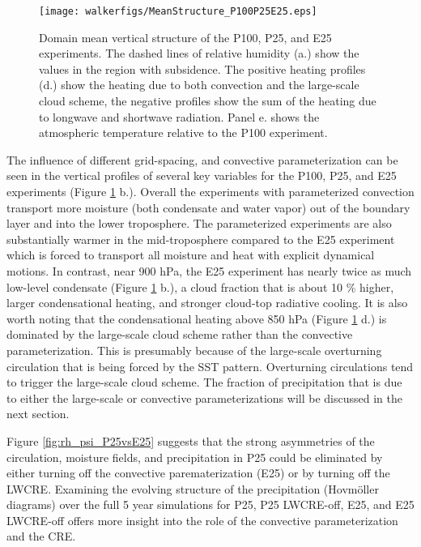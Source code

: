 \documentclass[draft]{agujournal2019}
\begin{document}
\begin{figure}
  \centering
      \texttt{[image: walkerfigs/MeanStructure\_P100P25E25.eps]}
  \caption{Domain mean vertical structure of the P100, P25, and E25 experiments.  The dashed lines of relative humidity (a.) show the values 
  in the region with subsidence.  The positive heating profiles (d.) show the heating due to both convection and the large-scale cloud scheme, the negative
  profiles show the sum of the heating due to longwave and shortwave radiation.  Panel e. shows the atmospheric temperature relative to the P100 experiment.}
  \label{fig:profiles_P100P25E25}
\end{figure}


The influence of different grid-spacing, and convective parameterization can be seen in the vertical profiles of several key variables for 
the P100, P25, and E25 experiments (Figure \ref{fig:profiles_P100P25E25} b.).  
Overall the experiments with parameterized convection transport more moisture (both condensate and water vapor)
out of the boundary layer and into the lower troposphere.  The parameterized experiments are also substantially warmer in the mid-troposphere compared to 
the E25 experiment which is forced to transport all moisture and heat with explicit dynamical motions.  In contrast, near 900 hPa, the E25 experiment has nearly twice
as much low-level condensate (Figure \ref{fig:profiles_P100P25E25} b.), a cloud fraction that is about 10 \% higher, larger condensational heating, and 
stronger cloud-top radiative cooling.  It is also worth noting that the condensational heating above 850 hPa (Figure \ref{fig:profiles_P100P25E25} d.) is dominated by 
the large-scale cloud scheme rather than the convective parameterization.  This is presumably because of the large-scale overturning circulation that is 
being forced by the SST pattern.  Overturning circulations tend to trigger the large-scale cloud scheme.  The fraction of precipitation that is due to either 
the large-scale or convective parameterizations will be discussed in the next section.  

Figure \ref{fig:rh_psi_P25vsE25} suggests that the strong asymmetries of the circulation, moisture fields, and precipitation in P25 could be eliminated 
by either turning off the convective parematerization (E25) or by turning off the LWCRE.  Examining the evolving structure of the 
precipitation (Hovm{\"o}ller diagrams) over the full 5 year simulations for P25, P25 LWCRE-off, E25, and E25 LWCRE-off offers more insight into the role of the convective parameterization and the CRE.      
\end{document}
